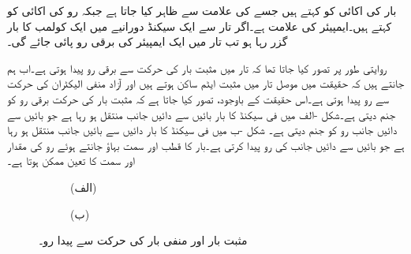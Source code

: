بار کی اکائی کو  کہتے ہیں جسے  کی علامت سے ظاہر کیا جاتا ہے جبکہ رو کی اکائی کو  کہتے ہیں۔ایمپیئر کی علامت  ہے۔اگر تار سے ایک سیکنڈ دورانیے میں ایک کولمب کا بار گزر رہا ہو تب تار میں ایک ایمپیئر کی برقی رو پائی جائے گی۔

روایتی طور پر تصور کیا جاتا تھا کہ تار میں مثبت بار کی حرکت سے برقی رو پیدا ہوتی ہے۔اب ہم جانتے ہیں کہ حقیقت میں موصل تار میں مثبت ایٹم ساکن ہوتے ہیں اور آزاد منفی الیکٹران کی  حرکت سے  رو پیدا ہوتی ہے۔اس حقیقت کے باوجود، تصور کیا جاتا ہے کہ مثبت بار کی حرکت برقی رو کو جنم دیتی ہے۔شکل -الف میں فی سیکنڈ  کا بار بائیں سے دائیں جانب منتقل ہو رہا ہے جو بائیں سے دائیں جانب  رو کو جنم دیتی ہے۔ شکل -ب میں فی سیکنڈ   کا بار دائیں سے بائیں جانب منتقل ہو رہا ہے جو بائیں سے دائیں جانب  کی رو پیدا کرتی ہے۔بار کا قطب اور سمت بہاؤ جانتے ہوئے رو کی مقدار اور سمت کا تعین ممکن ہوتا ہے۔
\begin{figure}
\centering
\begin{subfigure}{0.5\textwidth}
\centering
{}
\caption*{(الف)}
\end{subfigure}%
\begin{subfigure}{0.5\textwidth}
\centering
{}
\caption*{(ب)}
\end{subfigure}%
\caption{مثبت بار اور منفی بار کی حرکت سے پیدا رو۔}
\label{شکل_بنیادی_مثبت_منفی_بار_رو}
\end{figure}

